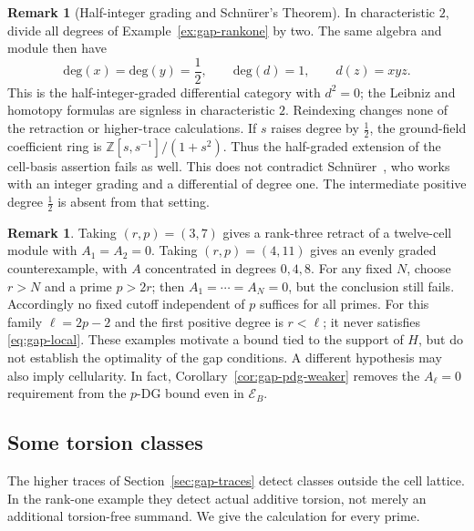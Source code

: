 \documentclass[11pt]{article}
\theoremstyle{definition}
\newtheorem{rem}[thm]{Remark}
\numberwithin{equation}{section}
\newcommand{\Ecat}{\mathcal{E}_B}
\begin{document}
\begin{rem}[Half-integer grading and Schn\"urer's Theorem]
\label{rem:gap-half}
In characteristic $2$, divide all degrees of Example~\ref{ex:gap-rankone}
by two.  The same algebra and module then have
\[
\mathrm{deg}(x)=\mathrm{deg}(y)=\frac{1}{2},\qquad \mathrm{deg}(d)=1,\qquad d(z)=xyz.
\]
This is the half-integer-graded differential category with $d^2=0$;
the Leibniz and homotopy formulas are signless in characteristic $2$.
Reindexing changes none of the retraction or higher-trace calculations.
If $s$ raises degree by $\tfrac12$, the ground-field coefficient ring is
$\mathbb Z[s,s^{-1}]/(1+s^2)$.  Thus the half-graded extension of the
cell-basis assertion fails as well.  This does not contradict
Schn\"urer~\cite[Theorems~1 and~2]{SchPos}, who works with an integer
grading and a differential of degree one.  The intermediate positive
degree $\tfrac12$ is absent from that setting.
\end{rem}

\begin{rem}
\label{rem:gap-not-sharp}
Taking $(r,p)=(3,7)$ gives a rank-three retract of a twelve-cell module
with $A_1=A_2=0$.  Taking $(r,p)=(4,11)$ gives an evenly graded
counterexample, with $A$ concentrated in degrees $0,4,8$.
For any fixed $N$, choose $r>N$ and a prime $p>2r$; then
$A_1=\cdots=A_N=0$, but the conclusion still fails.
Accordingly no fixed cutoff independent of $p$ suffices for all primes.
For this family $\ell=2p-2$ and the first positive degree is $r<\ell$;
it never satisfies \eqref{eq:gap-local}.
These examples motivate a bound tied to the support of $H$, but do not
establish the optimality of the gap conditions.  A different hypothesis may also imply cellularity.
In fact, Corollary~\ref{cor:gap-pdg-weaker} removes the $A_\ell=0$ requirement from the
$p$-DG bound even in $\Ecat$.
\end{rem}


\subsection{Some torsion classes}
\label{sec:K0-torsion}
The higher traces of Section~\ref{sec:gap-traces} detect classes
outside the cell lattice.  In the rank-one example they detect
actual additive torsion, not merely an additional torsion-free
summand.  We give the calculation for every prime.
\end{document}
